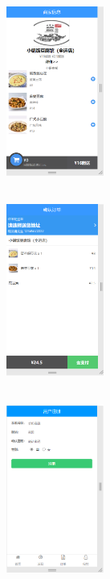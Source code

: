 \begin{figure}[H]
{\begin{minipage}[t]{0.22\linewidth}
            \includegraphics[width=3.2cm,height=6.4cm]{figures/3.1.3.png}\\
            \includegraphics[width=3.2cm,height=6.4cm]{figures/3.1.4.png}\\
            \includegraphics[width=3.2cm,height=6.4cm]{figures/3.1.10.png}\\
        \end{minipage}
    }
\end{figure}
